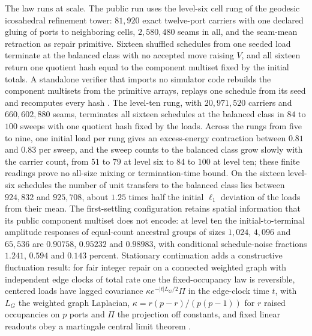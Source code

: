 \documentclass[11pt]{article}
\theoremstyle{definition}
\theoremstyle{remark}
\begin{document}
The law runs at scale. The public run uses the level-six cell rung of the
geodesic icosahedral refinement tower: $81{,}920$ exact twelve-port carriers
with one declared gluing of ports to neighboring cells, $2{,}580{,}480$
seams in all, and the seam-mean retraction as repair primitive. Sixteen
shuffled schedules from one seeded load terminate at the balanced class with
no accepted move raising $V$, and all sixteen return one quotient hash equal to the component multiset fixed by the initial totals.
A standalone verifier that imports no simulator code rebuilds the component
multisets from the primitive arrays, replays one schedule from its seed and
recomputes every hash \cite{ophsim}. The level-ten rung, with $20{,}971{,}520$ carriers and $660{,}602{,}880$ seams,
terminates all sixteen schedules at the balanced class in $84$ to $100$ sweeps
with one quotient hash fixed by the loads. Across the rungs from five to nine, one initial load per rung gives an excess-energy contraction between $0.81$ and $0.83$ per sweep, and the sweep counts to the balanced class grow slowly with the carrier count, from $51$ to $79$ at level six to $84$ to $100$ at level ten; these finite readings prove no all-size mixing or termination-time bound. On the sixteen level-six schedules the number of unit transfers to the balanced class lies between $924{,}832$ and $925{,}708$, about $1.25$ times half the initial $\ell_1$ deviation of the loads from their mean. The first-settling configuration retains
spatial information that its public component multiset does not encode: at
level ten the initial-to-terminal amplitude responses of equal-count
ancestral groups of sizes $1{,}024$, $4{,}096$ and $65{,}536$ are $0.90758$,
$0.95232$ and $0.98983$, with conditional schedule-noise fractions
$1.241$, $0.594$ and $0.143$ percent. Stationary continuation adds a
constructive fluctuation result: for fair integer repair on a connected
weighted graph with independent edge clocks of total rate one the fixed-occupancy law is reversible, centered loads have lagged covariance $\kappa e^{-|t|L_G/2}\Pi$ in the edge-clock time $t$, with $L_G$ the weighted graph Laplacian,
$\kappa=r(p-r)/(p(p-1))$ for $r$ raised occupancies on $p$ ports and $\Pi$ the
projection off constants, and fixed linear readouts obey a martingale central
limit theorem \cite{ophMicrophysics}.
\end{document}
